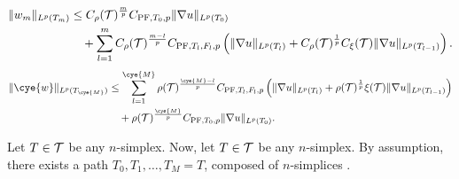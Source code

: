 \documentclass[a4paper]{article}
\begin{document}
        \begin{align*}
        \| w_{m} \|_{L^{p}(T_m)}
        &\leq 
        C_\rho({\mathcal T})^{\frac m p}
        C_{{\rm PF},T_{0},p} 
        \| \nabla u \|_{L^{p}( T_{0} )}
        \\&\quad 
        +
        \sum_{l=1}^{m} 
        C_\rho({\mathcal T})^{\frac {m-l} p}
        C_{{\rm PF},T_{l},F_{l},p} 
        \left( 
            \| \nabla u \|_{L^{p}(T_{l})} 
            +
            C_\rho({\mathcal T})^{\frac {1} p}
            C_\xi({\mathcal T})
            \| \nabla u \|_{L^{p}(T_{l-1})} 
        \right)
        .
    \end{align*}
    \begin{align*}
        \| \cye{w} \|_{L^{p}(T_{\cye{M}})}
        &\leq 
        \sum_{l=1}^{\cye{M}} 
        \rho(\calT)^{\frac {\cye{M}-l} p}
        C_{\PF,T_{l},F_{l},p} 
        \left( 
            \| \nabla u \|_{L^{p}(T_{l})} 
            +
            \rho(\calT)^{\frac {1} p}
            \xi(\calT)
            \| \nabla u \|_{L^{p}(T_{l-1})} 
        \right)
        \\&\quad 
        + \rho(\calT)^{\frac{\cye{M}}{p}}
        C_{\PF,T_{0},p} 
        \| \nabla u \|_{L^{p}( T_{0} )}
        .
    \end{align*}

    Let $T \in {\mathcal T}$ be any $n$-simplex. 
    Now, let $T \in {\mathcal T}$ be any $n$-simplex. 
    By assumption, there exists a  path $T_0, T_1, \dots, T_M = T$, composed of $n$-simplices . 
    
\end{document}
